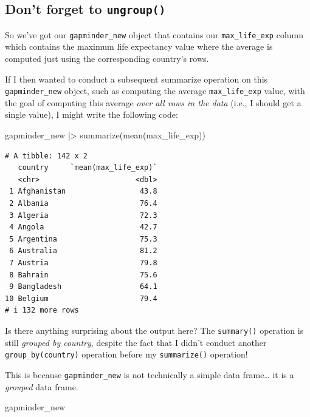 \documentclass[
  letterpaper,
  DIV=11,
  numbers=noendperiod]{scrreprt}
\newenvironment{Shaded}{\begin{snugshade}}{\end{snugshade}}
\newcommand{\FunctionTok}[1]{\textcolor[rgb]{0.28,0.35,0.67}{#1}}
\newcommand{\NormalTok}[1]{\textcolor[rgb]{0.00,0.23,0.31}{#1}}
\newcommand{\SpecialCharTok}[1]{\textcolor[rgb]{0.37,0.37,0.37}{#1}}
\begin{document}
\subsection{\texorpdfstring{Don't forget to
\texttt{ungroup()}}{Don't forget to ungroup()}}\label{dont-forget-to-ungroup}

So we've got our \texttt{gapminder\_new} object that contains our
\texttt{max\_life\_exp} column which contains the maximum life
expectancy value where the average is computed just using the
corresponding country's rows.

If I then wanted to conduct a subsequent summarize operation on this
\texttt{gapminder\_new} object, such as computing the average
\texttt{max\_life\_exp} value, with the goal of computing this average
\emph{over all rows in the data} (i.e., I should get a single value), I
might write the following code:

\begin{Shaded}
\begin{Highlighting}[]
\NormalTok{gapminder\_new }\SpecialCharTok{|\textgreater{}} \FunctionTok{summarize}\NormalTok{(}\FunctionTok{mean}\NormalTok{(max\_life\_exp))}
\end{Highlighting}
\end{Shaded}

\begin{verbatim}
# A tibble: 142 x 2
   country     `mean(max_life_exp)`
   <chr>                      <dbl>
 1 Afghanistan                 43.8
 2 Albania                     76.4
 3 Algeria                     72.3
 4 Angola                      42.7
 5 Argentina                   75.3
 6 Australia                   81.2
 7 Austria                     79.8
 8 Bahrain                     75.6
 9 Bangladesh                  64.1
10 Belgium                     79.4
# i 132 more rows
\end{verbatim}

Is there anything surprising about the output here? The
\texttt{summary()} operation is still \emph{grouped by country}, despite
the fact that I didn't conduct another \texttt{group\_by(country)}
operation before my \texttt{summarize()} operation!

This is because \texttt{gapminder\_new} is not technically a simple data
frame\ldots{} it is a \emph{grouped} data frame.

\begin{Shaded}
\begin{Highlighting}[]
\NormalTok{gapminder\_new}
\end{Highlighting}
\end{Shaded}
\end{document}
